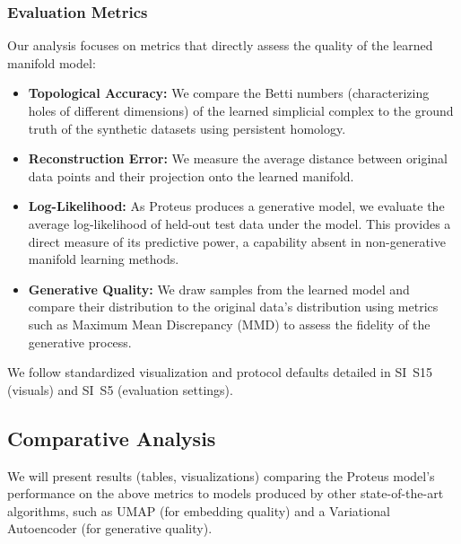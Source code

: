 \documentclass[11pt]{article}
\begin{document}
\subsubsection{Evaluation Metrics}
Our analysis focuses on metrics that directly assess the quality of the learned manifold model:
\begin{itemize}
    \item \textbf{Topological Accuracy:} We compare the Betti numbers (characterizing holes of different dimensions) of the learned simplicial complex to the ground truth of the synthetic datasets using persistent homology.
    \item \textbf{Reconstruction Error:} We measure the average distance between original data points and their projection onto the learned manifold.
    \item \textbf{Log-Likelihood:} As Proteus produces a generative model, we evaluate the average log-likelihood of held-out test data under the model. This provides a direct measure of its predictive power, a capability absent in non-generative manifold learning methods.
    \item \textbf{Generative Quality:} We draw samples from the learned model and compare their distribution to the original data's distribution using metrics such as Maximum Mean Discrepancy (MMD) to assess the fidelity of the generative process.
\end{itemize}
We follow standardized visualization and protocol defaults detailed in SI~S15 (visuals) and SI~S5 (evaluation settings).

\subsection{Comparative Analysis}
We will present results (tables, visualizations) comparing the Proteus model's performance on the above metrics to models produced by other state-of-the-art algorithms, such as UMAP (for embedding quality) and a Variational Autoencoder (for generative quality).
\end{document}
